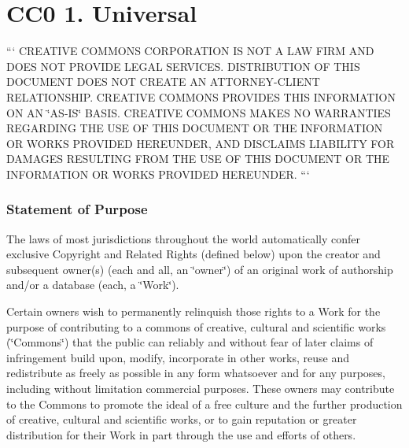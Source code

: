 \section*{C\+C0 1. Universal}

``` C\+R\+E\+A\+T\+I\+V\+E C\+O\+M\+M\+O\+N\+S C\+O\+R\+P\+O\+R\+A\+T\+I\+O\+N I\+S N\+O\+T A L\+A\+W F\+I\+R\+M A\+N\+D D\+O\+E\+S N\+O\+T P\+R\+O\+V\+I\+D\+E L\+E\+G\+A\+L S\+E\+R\+V\+I\+C\+E\+S. D\+I\+S\+T\+R\+I\+B\+U\+T\+I\+O\+N O\+F T\+H\+I\+S D\+O\+C\+U\+M\+E\+N\+T D\+O\+E\+S N\+O\+T C\+R\+E\+A\+T\+E A\+N A\+T\+T\+O\+R\+N\+E\+Y-\/\+C\+L\+I\+E\+N\+T R\+E\+L\+A\+T\+I\+O\+N\+S\+H\+I\+P. C\+R\+E\+A\+T\+I\+V\+E C\+O\+M\+M\+O\+N\+S P\+R\+O\+V\+I\+D\+E\+S T\+H\+I\+S I\+N\+F\+O\+R\+M\+A\+T\+I\+O\+N O\+N A\+N \char`\"{}\+A\+S-\/\+I\+S\char`\"{} B\+A\+S\+I\+S. C\+R\+E\+A\+T\+I\+V\+E C\+O\+M\+M\+O\+N\+S M\+A\+K\+E\+S N\+O W\+A\+R\+R\+A\+N\+T\+I\+E\+S R\+E\+G\+A\+R\+D\+I\+N\+G T\+H\+E U\+S\+E O\+F T\+H\+I\+S D\+O\+C\+U\+M\+E\+N\+T O\+R T\+H\+E I\+N\+F\+O\+R\+M\+A\+T\+I\+O\+N O\+R W\+O\+R\+K\+S P\+R\+O\+V\+I\+D\+E\+D H\+E\+R\+E\+U\+N\+D\+E\+R, A\+N\+D D\+I\+S\+C\+L\+A\+I\+M\+S L\+I\+A\+B\+I\+L\+I\+T\+Y F\+O\+R D\+A\+M\+A\+G\+E\+S R\+E\+S\+U\+L\+T\+I\+N\+G F\+R\+O\+M T\+H\+E U\+S\+E O\+F T\+H\+I\+S D\+O\+C\+U\+M\+E\+N\+T O\+R T\+H\+E I\+N\+F\+O\+R\+M\+A\+T\+I\+O\+N O\+R W\+O\+R\+K\+S P\+R\+O\+V\+I\+D\+E\+D H\+E\+R\+E\+U\+N\+D\+E\+R. ```

\subsubsection*{Statement of Purpose}

The laws of most jurisdictions throughout the world automatically confer exclusive Copyright and Related Rights (defined below) upon the creator and subsequent owner(s) (each and all, an \char`\"{}owner\char`\"{}) of an original work of authorship and/or a database (each, a \char`\"{}\+Work\char`\"{}).

Certain owners wish to permanently relinquish those rights to a Work for the purpose of contributing to a commons of creative, cultural and scientific works (\char`\"{}\+Commons\char`\"{}) that the public can reliably and without fear of later claims of infringement build upon, modify, incorporate in other works, reuse and redistribute as freely as possible in any form whatsoever and for any purposes, including without limitation commercial purposes. These owners may contribute to the Commons to promote the ideal of a free culture and the further production of creative, cultural and scientific works, or to gain reputation or greater distribution for their Work in part through the use and efforts of others.

